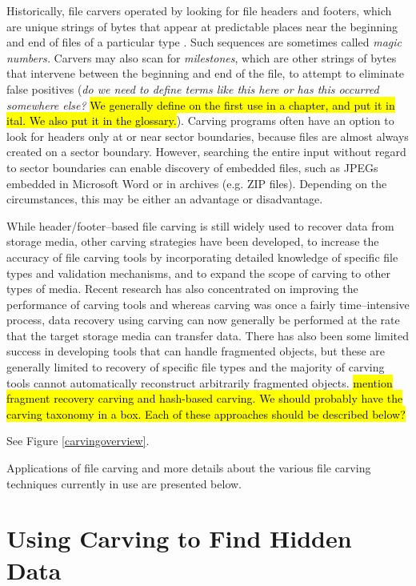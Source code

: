 Historically, file carvers operated by looking for file headers and
footers, which are unique strings of bytes that appear at predictable
places near the beginning and end of files of a particular type
\cite{Foremost, Scalpel}.  Such sequences are sometimes called
\emph{magic numbers.} Carvers may also scan for \emph{milestones}, which
are other strings of bytes that intervene between the beginning and
end of the file, to attempt to eliminate false positives (\emph{do we
  need to define terms like this here or has this occurred somewhere
  else?} \hl{We generally define on the first use in a chapter, and
  put it in ital. We also put it in the glossary.})\label{def:milestones}.  Carving programs often have an option to look for headers
only at or near sector boundaries, because files are almost always
created on a sector boundary.  However, searching the entire input
without regard to sector boundaries can enable discovery of embedded
files, such as JPEGs embedded in Microsoft Word or in archives
(e.g. ZIP files).  Depending on the circumstances, this may be either an
advantage or disadvantage.   

While header/footer--based file carving is still widely used to
recover data from storage media, other carving strategies have been
developed, to increase the accuracy of file carving tools by
incorporating detailed knowledge of specific file types and validation
mechanisms, and to expand the scope of carving to other types of
media.  Recent research has also concentrated on improving the
performance of carving tools and whereas carving was once a fairly
time--intensive process, data recovery using carving can now generally
be performed at the rate that the target storage media can transfer
data.  There has also been some limited success in developing tools
that can handle fragmented objects, but these are generally limited to
recovery of specific file types and the majority of carving tools
cannot automatically reconstruct arbitrarily fragmented
objects. \hl{mention fragment recovery carving and hash-based carving. We should probably have the
  carving taxonomy in a box. Each of these approaches should be
  described below?}

See Figure \ref{carvingoverview}.  

Applications of file carving and more details about the various file carving techniques currently in use are presented below.

\section{Using Carving to Find Hidden Data}

